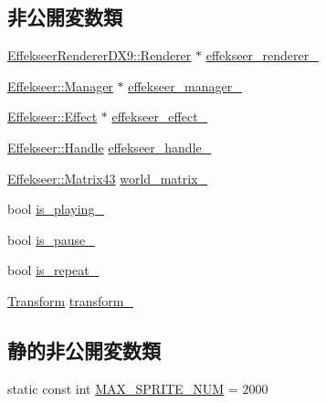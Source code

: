 \subsection*{非公開変数類}
\begin{DoxyCompactItemize}
\item 
\mbox{\hyperlink{class_effekseer_renderer_d_x9_1_1_renderer}{Effekseer\+Renderer\+D\+X9\+::\+Renderer}} $\ast$ \mbox{\hyperlink{class_effekseer_object_a39d29eb6a967f325b3d8659c231e0525}{effekseer\+\_\+renderer\+\_\+}}
\item 
\mbox{\hyperlink{class_effekseer_1_1_manager}{Effekseer\+::\+Manager}} $\ast$ \mbox{\hyperlink{class_effekseer_object_a9f66433b8cecd6753b478a73f93f8179}{effekseer\+\_\+manager\+\_\+}}
\item 
\mbox{\hyperlink{class_effekseer_1_1_effect}{Effekseer\+::\+Effect}} $\ast$ \mbox{\hyperlink{class_effekseer_object_a66c732f526b92301c72070648ca7e70f}{effekseer\+\_\+effect\+\_\+}}
\item 
\mbox{\hyperlink{namespace_effekseer_afba58b8d812da862190e9bbfc040824a}{Effekseer\+::\+Handle}} \mbox{\hyperlink{class_effekseer_object_ac3e771c9f05d91dfe392959591595b7e}{effekseer\+\_\+handle\+\_\+}}
\item 
\mbox{\hyperlink{struct_effekseer_1_1_matrix43}{Effekseer\+::\+Matrix43}} \mbox{\hyperlink{class_effekseer_object_a16171d7157607b9d6a5fc0aa4ad9d454}{world\+\_\+matrix\+\_\+}}
\item 
bool \mbox{\hyperlink{class_effekseer_object_a4ec40aadcda493d25823d95a3035c29d}{is\+\_\+playing\+\_\+}}
\item 
bool \mbox{\hyperlink{class_effekseer_object_ad34fd902c49b1f68dc7b212fe9d2676d}{is\+\_\+pause\+\_\+}}
\item 
bool \mbox{\hyperlink{class_effekseer_object_a4beb29e4b63e4013d1916ccada3c5635}{is\+\_\+repeat\+\_\+}}
\item 
\mbox{\hyperlink{class_transform}{Transform}} \mbox{\hyperlink{class_effekseer_object_a53e096d7eebae5339b2df3c91bc30e7e}{transform\+\_\+}}
\end{DoxyCompactItemize}
\subsection*{静的非公開変数類}
\begin{DoxyCompactItemize}
\item 
static const int \mbox{\hyperlink{class_effekseer_object_a6edfdaac66134eee3264923075abb1f0}{M\+A\+X\+\_\+\+S\+P\+R\+I\+T\+E\+\_\+\+N\+UM}} = 2000
\end{DoxyCompactItemize}


